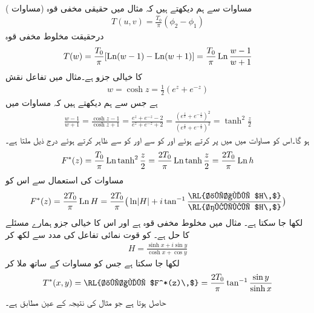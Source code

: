\quad {}\\
مساوات  سے ہم دیکھتے ہیں کہ مثال  میں حقیقی مخفی قوہ (مساوات )
\begin{align*}
T(u,v)=\frac{T_0}{\pi}(\phi_2-\phi_1)
\end{align*}
درحقیقت مخلوط مخفی قوہ
\begin{align}\label{مساوات_نقش_مخلوط_مخفی_قوہ_مثال_الف}
T(w)=\frac{T_0}{\pi}[\operatorname{Ln}(w-1)-\operatorname{Ln}(w+1)]=\frac{T_0}{\pi}\operatorname{Ln}\frac{w-1}{w+1}
\end{align}
کا خیالی جزو ہے۔مثال  میں تفاعل نقش
\begin{align*}
w=\cosh z=\frac{1}{2}(e^z+e^{-z})
\end{align*}
ہے جس سے ہم دیکھتے ہیں کہ مساوات  میں
\begin{align*}
\frac{w-1}{w+1}=\frac{\cosh z-1}{\cosh z+1}=\frac{e^z+e^{-z}-2}{e^z+e^{-z}+2}=\frac{(e^{\frac{z}{2}}+e^{-\frac{z}{2}})^2}{(e^{\frac{z}{2}}+e^{-\frac{z}{2}})^2}=\tanh^2 \frac{z}{2}
\end{align*}
ہو گا۔اس کو مساوات  میں میں پر کرتے ہوئے اور  کو  سے اور  کو  سے  ظاہر کرتے ہوئے  درج ذیل ملتا ہے۔
\begin{align}
F^*(z)=\frac{T_0}{\pi}\operatorname{Ln} \tanh^2\frac{z}{2}=\frac{2T_0}{\pi}\operatorname{Ln} \tanh \frac{z}{2}=\frac{2T_0}{\pi} \operatorname{Ln} h
\end{align}
مساوات  کی استعمال سے اس کو
\begin{align}\label{مساوات_نقش_ایک_حل}
F^*(z)=\frac{2T_0}{\pi} \Ln H=\frac{2T_0}{\pi} \big(\ln\abs{H}+i\tan^{-1}\frac{\text{\RL{خیالی $H\,$}}}{\text{\RL{حقیقی $H\,$}}}\big)
\end{align}
لکھا جا سکتا ہے۔  مثال  میں مخلوط مخفی قوہ ہے اور اس کا خیالی جزو ہمارے مسئلے کا حل ہے۔ کو قوت نمائی تفاعل کی مدد سے لکھ کر
\begin{align}\label{مساوات_نقش_حل_دوسری_شکل}
H=\frac{\sinh x+i\sin y}{\cosh x+\cos y}
\end{align}
لکھا جا سکتا ہے جس کو مساوات  کے ساتھ ملا کر
\begin{align*}
T^*(x,y)=\text{\RL{خیالی $F^*(z)\,$}}=\frac{2T_0}{\pi}\tan^{-1} \frac{\sin y}{\sinh x}
\end{align*}
حاصل ہوتا  ہے جو مثال  کی نتیجہ کے عین مطابق ہے۔

